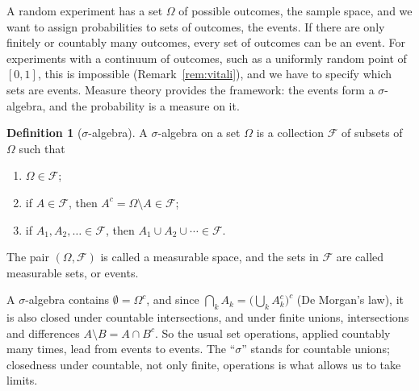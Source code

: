 \documentclass[11pt]{article}
\theoremstyle{definition}
\newtheorem{definition}{Definition}[section]
\theoremstyle{plain}
\theoremstyle{remark}
\begin{document}
A random experiment has a set $\Omega$ of possible outcomes, the sample space, and we want to assign probabilities to sets of outcomes, the events. If there are only finitely or countably many outcomes, every set of outcomes can be an event. For experiments with a continuum of outcomes, such as a uniformly random point of $[0, 1]$, this is impossible (Remark~\ref{rem:vitali}), and we have to specify which sets are events. Measure theory provides the framework: the events form a $\sigma$-algebra, and the probability is a measure on it.

\begin{definition}[$\sigma$-algebra]\label{def:sigma-algebra}
    A $\sigma$-algebra on a set $\Omega$ is a collection $\mathcal{F}$ of subsets of $\Omega$ such that
    \begin{enumerate}
        \item $\Omega \in \mathcal{F}$;
        \item if $A \in \mathcal{F}$, then $A^c = \Omega \setminus A \in \mathcal{F}$;
        \item if $A_1, A_2, \ldots \in \mathcal{F}$, then $A_1 \cup A_2 \cup \cdots \in \mathcal{F}$.
    \end{enumerate}
    The pair $(\Omega, \mathcal{F})$ is called a measurable space, and the sets in $\mathcal{F}$ are called measurable sets, or events.
\end{definition}

A $\sigma$-algebra contains $\emptyset = \Omega^c$, and since $\bigcap_k A_k = \big(\bigcup_k A_k^c\big)^c$ (De Morgan's law), it is also closed under countable intersections, and under finite unions, intersections and differences $A \setminus B = A \cap B^c$. So the usual set operations, applied countably many times, lead from events to events. The ``$\sigma$'' stands for countable unions; closedness under countable, not only finite, operations is what allows us to take limits.
\end{document}
